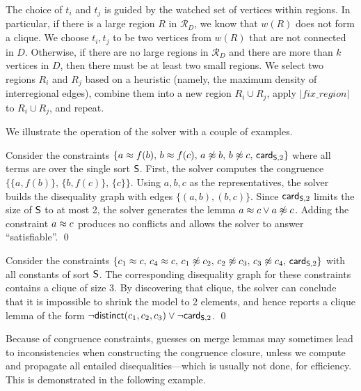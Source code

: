 \documentclass{svjour3}                     %
\begin{document}
The choice of $t_i$ and $t_j$ is guided by the watched set of vertices within regions.
In particular,
if there is a large region $R$ in $\mathcal{R}_D$, we know that $w(R)$ does not form a clique.
We choose $t_i, t_j$ to be two vertices from $w(R)$ that are not connected in $D$.
Otherwise, if there are no large regions in $\mathcal{R}_D$ and 
there are more than $k$ vertices in $D$,
then there must be at least two small regions.
We select two regions $R_i$ and $R_j$ based on a heuristic 
(namely, the maximum density of interregional edges),
combine them into a new region $R_i \cup R_j$, apply $|fix\_region|$ to $R_i \cup R_j$, and repeat.

We illustrate the operation of the \fcc solver with a couple of examples.

\begin{example}
Consider the constraints 
$\{ a \teq f( b ),\, b \teq f( c ),\, a \tneq b,\, b \tneq c,\, \card[\So,2] \}$ 
where all terms are over the single sort $\So$.
First, the \fcc solver computes the congruence
$\{\{a,f( b )\},\, \{b, f( c )\},\, \{c\}\}$.
Using $a, b, c$ as the representatives,
the solver builds the disequality graph with edges
$\{(a,b),(b,c)\}$.
Since $\card[\So,2]$ limits the size of $\So$ to at most 2, 
the solver generates the lemma $a \teq c \lor a \tneq c$.
Adding the constraint $a \teq c$ produces no conflicts and 
allows the \fcc solver to answer ``satisfiable''.
\qed
\end{example}

\begin{example}
Consider the constraints 
$\{ c_1 \teq c,\, c_4 \teq c,\, c_1 \tneq c_2,\, c_2 \tneq c_3,\, c_3 \tneq c_4,\, \card[\So,2]\}$
with all constants of sort $\So$. 
The corresponding disequality graph for these constraints contains 
a clique of size 3.
By discovering that clique, the \fcc solver can conclude that it is impossible
to shrink the model to 2 elements, and hence reports a clique lemma of the form
$\neg \distinct( c_1, c_2, c_3 ) \lor \lnot\card[\So,2]$.
\qed
\end{example}

Because of congruence constraints, guesses on merge lemmas may sometimes lead 
to inconsistencies when constructing the congruence closure, unless we
compute and propagate all entailed disequalities---which is usually not done,
for efficiency.
This is demonstrated in the following example.
\end{document}
